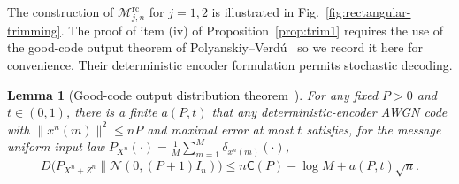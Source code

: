\documentclass[11pt,onecolumn]{IEEEtran}
\newcommand{\calM}{\mathcal{M}}
\newcommand{\calN}{\mathcal{N}}
\newcommand{\rvC}{\mathsf{C}}
\newtheorem{lemma}[theorem]{Lemma}
\newcommand{\rc}{\mathrm{rc}}
\begin{document}
The construction of $\calM_{j,n}^\rc$ for $j = 1,2$ is illustrated in Fig.~\ref{fig:rectangular-trimming}. The proof of item (iv) of Proposition~\ref{prop:trim1} requires the use of the good-code output theorem of Polyanskiy--Verd\'u~\cite{PolVerdu14} so we record it here for convenience. Their deterministic encoder
formulation permits stochastic decoding.
\begin{lemma}[Good-code output distribution theorem~\cite{PolVerdu14}] \label{lem:good_code}
For any fixed $P>0$ and $t\in (0,1)$, there is a finite $a(P,t)$ that any deterministic-encoder AWGN code with $\|x^n(m)\|^2\le nP$ and maximal error at most $t$ satisfies, for the message uniform input law $P_{X^n}(\cdot ) = \frac{1}{M}\sum_{m=1}^M \delta_{x^n(m)} (\cdot)$, 
\begin{align}
D\big(P_{X^n+Z^n} \|\calN(0,(P+1)I_n) \big)\le n\rvC(P)-\log M + a(P,t)\sqrt{n}.
\end{align}
\end{lemma}
\end{document}
